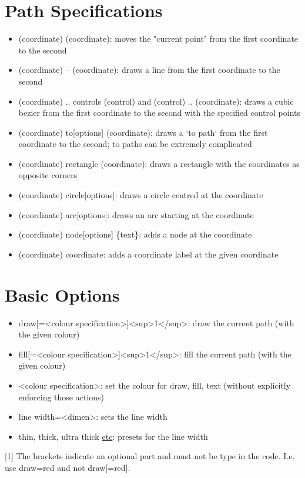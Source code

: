 \documentclass[a4paper,10pt]{article}
\newcommand{\myCode}[1]{\colorbox{gray!30}{#1}}
\begin{document}
\section*{Path Specifications}
\begin{itemize}
    \item \myCode{(coordinate) (coordinate)}: moves the "current point" from the first coordinate to the second
    \item \myCode{(coordinate) -- (coordinate)}: draws a line from the first coordinate to the second
    \item \myCode{(coordinate) .. controls (control) and (control) .. (coordinate)}: draws a cubic bezier from the first coordinate to the second with the specified control points
    \item \myCode{(coordinate) to[options] (coordinate)}: draws a `to path` from the first coordinate to the second; \myCode{to path}s can be extremely complicated
    \item \myCode{(coordinate) rectangle (coordinate)}: draws a rectangle with the coordinates as opposite corners
    \item \myCode{(coordinate) circle[options]}: draws a circle centred at the coordinate
    \item \myCode{(coordinate) arc[options]}: draws an arc starting at the coordinate
    \item \myCode{(coordinate) node[options] \{text\}}: adds a node at the coordinate
    \item \myCode{(coordinate) coordinate}: adds a coordinate label at the given coordinate
\end{itemize}

\section*{Basic Options}
\begin{itemize}
    \item \myCode{draw[=<colour specification>]}<sup>1</sup>: draw the current path (with the given colour)
    \item \myCode{fill[=<colour specification>]}<sup>1</sup>: fill the current path (with the given colour)
    \item \myCode{<colour specification>}: set the colour for draw, fill, text (without explicitly enforcing those actions)
    \item \myCode{line width=<dimen>}: sets the line width
    \item \myCode{thin, thick, ultra thick} \href{http://martin-thoma.com/sizes-in-latex/}{etc}: presets for the line width
\end{itemize}

[1] The brackets indicate an optional part and must not be type in the code. I.e. use \myCode{draw=red} and not \myCode{draw[=red]}.
\end{document}
